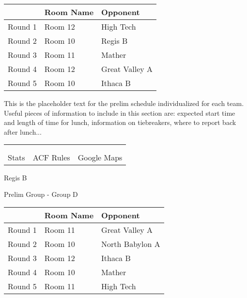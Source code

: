 \documentclass{article}%
\begin{document}
\vspace*{4pt}%
\begin{tabularx}{\textwidth}{|c|Y|Y|}%
\hline%
&Room Name&Opponent\\%
\hline%
Round 1&Room 12&High Tech\\%
Round 2&Room 10&Regis B\\%
Round 3&Room 11&Mather\\%
Round 4&Room 12&Great Valley A\\%
Round 5&Room 10&Ithaca B\\%
\hline%
\end{tabularx}%
\vspace*{30pt}%
\linebreak%
This is the placeholder text for the prelim schedule individualized for each team. Useful pieces of information to include in this section are: expected start time and length of time for lunch, information on tiebreakers, where to report back after lunch...%
\vspace*{30pt}%
\newline%
%
\begin{tabularx}{\textwidth}{YYY}%
  &  &  \\%
\\%
Stats&ACF Rules&Google Maps\\%
\end{tabularx}%
\newpage%
%
\begin{center}%
\begin{Huge}%
Regis B%
\end{Huge}%
\vspace*{12pt}%
\linebreak%
\begin{Large}%
Prelim Group {-} Group D%
\end{Large}%
\end{center}%
\vspace*{4pt}%
\begin{tabularx}{\textwidth}{|c|Y|Y|}%
\hline%
&Room Name&Opponent\\%
\hline%
Round 1&Room 11&Great Valley A\\%
Round 2&Room 10&North Babylon A\\%
Round 3&Room 12&Ithaca B\\%
Round 4&Room 10&Mather\\%
Round 5&Room 11&High Tech\\%
\hline%
\end{tabularx}%
\end{document}
